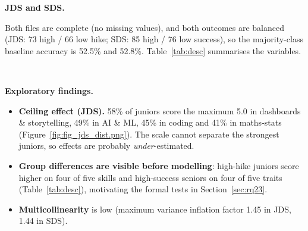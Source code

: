 \textbf{JDS and SDS.}

Both files are complete (no missing values), and both outcomes are balanced
(JDS: 73 high / 66 low hike; SDS: 85 high / 76 low success), so the majority-class baseline
accuracy is 52.5\% and 52.8\%. Table~\ref{tab:desc} summarises the variables.

\begin{table}[H]\centering\small
\caption{Descriptive statistics with group means by outcome.}\label{tab:desc}
\begin{subtable}{\linewidth}\centering
\caption{JDS Skill Traits (1--5 scale; outcome: salary hike).}
\end{subtable}\\[6pt]
\begin{subtable}{\linewidth}\centering
\caption{SDS Personality Traits (normalised scores; outcome: success).}
\end{subtable}
\end{table}

\textbf{Exploratory findings.}
\begin{itemize}
  \item \textbf{Ceiling effect (JDS).} 58\% of juniors score the maximum 5.0 in dashboards \&
        storytelling, 49\% in AI \& ML, 45\% in coding and 41\% in maths-stats
        (Figure~\ref{fig:fig_jds_dist.png}). The scale cannot separate the strongest juniors, so
        effects are probably \emph{under}-estimated.
  \item \textbf{Group differences are visible before modelling}: high-hike juniors score higher on
        four of five skills and high-success seniors on four of five traits (Table~\ref{tab:desc}),
        motivating the formal tests in Section~\ref{sec:rq23}.
  \item \textbf{Multicollinearity} is low (maximum variance inflation factor 1.45 in JDS, 1.44 in SDS).
\end{itemize}

